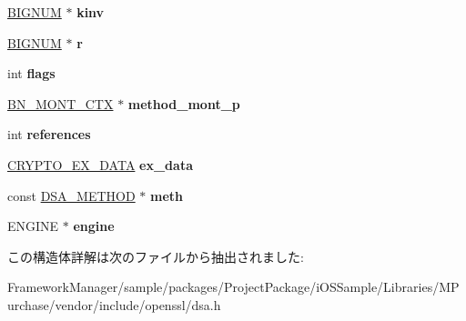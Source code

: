 \begin{DoxyCompactItemize}
\item 
\hypertarget{structdsa__st_a73b0fb2db5b8546f779cb157b18f19fc}{}\hyperlink{structbignum__st}{B\+I\+G\+N\+U\+M} $\ast$ {\bfseries kinv}\label{structdsa__st_a73b0fb2db5b8546f779cb157b18f19fc}

\item 
\hypertarget{structdsa__st_ab301cd06470fbfae28764c2115b60d97}{}\hyperlink{structbignum__st}{B\+I\+G\+N\+U\+M} $\ast$ {\bfseries r}\label{structdsa__st_ab301cd06470fbfae28764c2115b60d97}

\item 
\hypertarget{structdsa__st_a3c27d330e3e07368715455b5a019690d}{}int {\bfseries flags}\label{structdsa__st_a3c27d330e3e07368715455b5a019690d}

\item 
\hypertarget{structdsa__st_aea9e4de390af7d5bc289a203824ffb5f}{}\hyperlink{structbn__mont__ctx__st}{B\+N\+\_\+\+M\+O\+N\+T\+\_\+\+C\+T\+X} $\ast$ {\bfseries method\+\_\+mont\+\_\+p}\label{structdsa__st_aea9e4de390af7d5bc289a203824ffb5f}

\item 
\hypertarget{structdsa__st_a4a1337f8a116a7f1b322639edfa9d580}{}int {\bfseries references}\label{structdsa__st_a4a1337f8a116a7f1b322639edfa9d580}

\item 
\hypertarget{structdsa__st_a0def4851606ac230c65f4409de2c0c71}{}\hyperlink{structcrypto__ex__data__st}{C\+R\+Y\+P\+T\+O\+\_\+\+E\+X\+\_\+\+D\+A\+T\+A} {\bfseries ex\+\_\+data}\label{structdsa__st_a0def4851606ac230c65f4409de2c0c71}

\item 
\hypertarget{structdsa__st_af5e872d3d77bbba895b6b917f1a71d3a}{}const \hyperlink{structdsa__method}{D\+S\+A\+\_\+\+M\+E\+T\+H\+O\+D} $\ast$ {\bfseries meth}\label{structdsa__st_af5e872d3d77bbba895b6b917f1a71d3a}

\item 
\hypertarget{structdsa__st_a0cfa8000f47729c5eb6cc2053eb01b75}{}E\+N\+G\+I\+N\+E $\ast$ {\bfseries engine}\label{structdsa__st_a0cfa8000f47729c5eb6cc2053eb01b75}

\end{DoxyCompactItemize}


この構造体詳解は次のファイルから抽出されました\+:\begin{DoxyCompactItemize}
\item 
Framework\+Manager/sample/packages/\+Project\+Package/i\+O\+S\+Sample/\+Libraries/\+M\+Purchase/vendor/include/openssl/dsa.\+h\end{DoxyCompactItemize}
